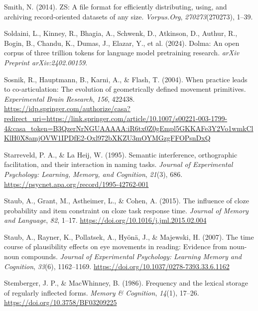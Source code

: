 \documentclass[
  12pt,
  letterpaper,
]{scrreport}
\newlength{\cslhangindent}
\newenvironment{CSLReferences}[2] %
 {\begin{list}{}{%
  \setlength{\itemindent}{0pt}
  \setlength{\leftmargin}{0pt}
  \setlength{\parsep}{0pt}
  \ifodd #1
   \setlength{\leftmargin}{\cslhangindent}
   \setlength{\itemindent}{-1\cslhangindent}
  \fi
  \setlength{\itemsep}{#2\baselineskip}}}
 {\end{list}}
\begin{document}
\begin{CSLReferences}{1}{0}
Smith, N. (2014). ZS: A file format for efficiently distributing, using,
and archiving record-oriented datasets of any size. \emph{Vorpus.Org},
\emph{270273}(270273), 1--39.

Soldaini, L., Kinney, R., Bhagia, A., Schwenk, D., Atkinson, D., Authur,
R., Bogin, B., Chandu, K., Dumas, J., Elazar, Y., et al. (2024). Dolma:
An open corpus of three trillion tokens for language model pretraining
research. \emph{arXiv Preprint arXiv:2402.00159}.

Sosnik, R., Hauptmann, B., Karni, A., \& Flash, T. (2004). When practice
leads to co-articulation: The evolution of geometrically defined
movement primitives. \emph{Experimental Brain Research}, \emph{156},
422438.
\url{https://idp.springer.com/authorize/casa?redirect_uri=https://link.springer.com/article/10.1007/s00221-003-1799-4&casa_token=B3QzerNrNGUAAAAA:iR6tx0Z0gEmpl5GKKAFe3Y2Vo1wmkClKlH0X8amjOVW1IPDfE2-Oxl972bXKZU3mOYMGzgFFOPsnDxQ}

Starreveld, P. A., \& La Heij, W. (1995). Semantic interference,
orthographic facilitation, and their interaction in naming tasks.
\emph{Journal of Experimental Psychology: Learning, Memory, and
Cognition}, \emph{21}(3), 686.
\url{https://psycnet.apa.org/record/1995-42762-001}

Staub, A., Grant, M., Astheimer, L., \& Cohen, A. (2015). The influence
of cloze probability and item constraint on cloze task response time.
\emph{Journal of Memory and Language}, \emph{82}, 1--17.
\url{https://doi.org/10.1016/j.jml.2015.02.004}

Staub, A., Rayner, K., Pollatsek, A., Hyönä, J., \& Majewski, H. (2007).
The time course of plausibility effects on eye movements in reading:
Evidence from noun-noun compounds. \emph{Journal of Experimental
Psychology: Learning Memory and Cognition}, \emph{33}(6), 1162--1169.
\url{https://doi.org/10.1037/0278-7393.33.6.1162}

Stemberger, J. P., \& MacWhinney, B. (1986). Frequency and the lexical
storage of regularly inflected forms. \emph{Memory \& Cognition},
\emph{14}(1), 17--26. \url{https://doi.org/10.3758/BF03209225}


\end{CSLReferences}
\end{document}
